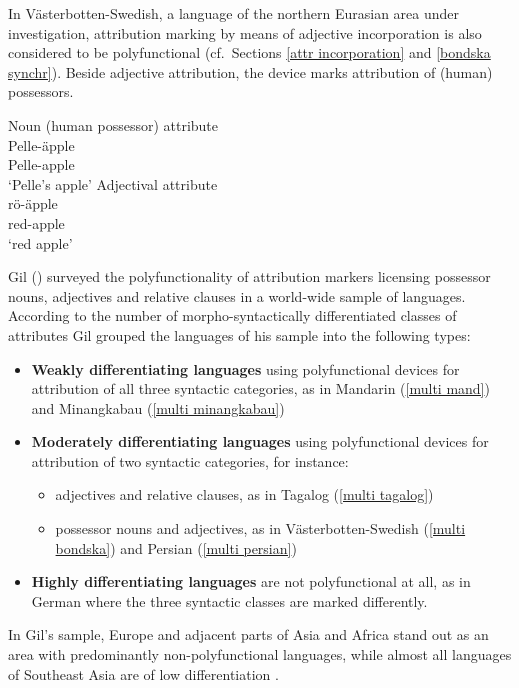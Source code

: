 In Västerbotten-Swedish, a language of the northern Eurasian area under investigation, attribution marking by means of adjective incorporation is also considered to be polyfunctional (cf.~Sections \ref{attr incorporation} and \ref{bondska synchr}). Beside adjective attribution, the device marks attribution of (human) possessors.
\begin{exe}
\ex 
{} \label{multi bondska}
\begin{xlist}
\ex \textrm{Noun (human possessor) attribute}\\
\gll	Pelle-äpple\\
	Pelle-apple\\
\glt	‘Pelle's apple’
\ex \textrm{Adjectival attribute}\\
\gll	rö-äpple\\
	red-apple\\
\glt	‘red apple’
\end{xlist}
\end{exe}
Gil (\citeyear{gil2005}) surveyed the polyfunctionality of attribution markers licensing possessor nouns, adjectives and relative clauses in a world-wide sample of languages. According to the number of morpho-syntactically differentiated classes of attributes Gil grouped the languages of his sample into the following types:
\begin{itemize}
\item \textbf{Weakly differentiating languages} using polyfunctional devices for attribution of all three syntactic categories, as in Mandarin (\ref{multi mand}) and Minangkabau (\ref{multi minangkabau})
\item \textbf{Moderately differentiating languages} using polyfunctional devices for attribution of two syntactic categories, for instance:
	\begin{itemize}
	\item adjectives and relative clauses, as in Tagalog (\ref{multi tagalog})
	\item possessor nouns and adjectives, as in Västerbotten-Swedish (\ref{multi bondska}) and Persian (\ref{multi persian})
	\end{itemize}
\item \textbf{Highly differentiating languages} are not polyfunctional at all, as in German where the three syntactic classes are marked differently.
\end{itemize}
In Gil's sample, Europe and adjacent parts of Asia and Africa stand out as an area with predominantly non-polyfunctional languages, while almost all languages of Southeast Asia are of low differentiation \citep[8]{gil2005}.

